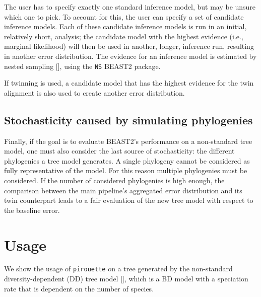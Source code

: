The user has to specify exactly one standard inference model,
but may be unsure which one to pick. To account for this, the user can
specify a set of candidate inference models. Each of these candidate inference models is run in an initial, relatively short, analysis; the candidate model with the highest 
evidence (i.e., marginal likelihood) will then be
used in another, longer, inference run, resulting in another error distribution.
The evidence for an inference model is estimated by nested 
sampling [\cite{russel2019model}], using the \verb;NS; BEAST2 package. 

If twinning is used, a candidate model that has the highest evidence for
the twin alignment is also used to create another error
distribution.

\subsection{Stochasticity caused by simulating phylogenies}

Finally, if the goal is to evaluate BEAST2's performance 
on a non-standard tree model, 
one must also consider the last source of stochasticity: 
the different phylogenies a tree model generates.
A single phylogeny cannot be considered as fully representative of the model. 
For this reason multiple phylogenies must be considered. 
If the number of considered phylogenies is high enough, 
the comparison between the main pipeline's aggregated error distribution 
and its twin counterpart leads to a fair evaluation 
of the new tree model with respect to the baseline error.

\section{Usage}

We show the usage of \verb;pirouette; on a tree generated 
by the non-standard diversity-dependent (DD) tree 
model [\citep{DDD, etienne2012diversity}],
which is a BD model with a speciation rate that is dependent on the number of species. 

